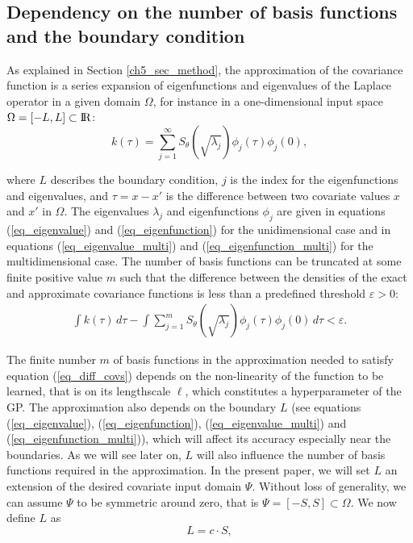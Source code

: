 \documentclass[onecolumn,a4paper,11pt]{article}
\begin{document}
\subsection{Dependency on the number of basis functions and the boundary condition} \label{ch5_subsec_dependency}

As explained in Section \ref{ch5_sec_method}, the approximation of the covariance function is a series expansion of eigenfunctions and eigenvalues of the Laplace operator in a given domain $\Omega$, for instance in a one-dimensional input space $\Omega=[-L,L]\subset {\rm I\!R}$:
%
\begin{equation*}
k(\tau) = \sum_{j=1}^{\infty} S_{\theta} \left(\sqrt{\lambda_j} \right) \phi_j(\tau) \phi_j(0), 
\end{equation*} 

\noindent where $L$ describes the boundary condition, $j$ is the index for the eigenfunctions and eigenvalues, and $\tau=x-x'$ is the difference between two covariate values $x$ and $x'$ in $\Omega$. The eigenvalues $\lambda_j$ and eigenfunctions $\phi_j$ are given in equations (\ref{eq_eigenvalue}) and (\ref{eq_eigenfunction}) for the unidimensional case and in equations (\ref{eq_eigenvalue_multi}) and (\ref{eq_eigenfunction_multi}) for the multidimensional case. The number of basis functions can be truncated at some finite positive value $m$ such that the difference between the densities of the exact and approximate covariance functions is less than a predefined threshold $\varepsilon > 0$:
%
\begin{eqnarray}\label{eq_diff_covs}
\int k(\tau) \, d\tau - 
\int \sum_{j=1}^m S_{\theta}\left(\sqrt{\lambda_j} \right) \phi_j(\tau) \phi_j(0) \, d\tau < \varepsilon.
\end{eqnarray}

The finite number $m$ of basis functions in the approximation needed to satisfy equation (\ref{eq_diff_covs}) depends on the non-linearity of the function to be learned, that is on its lengthscale $\ell$, which constitutes a hyperparameter of the GP. The approximation also depends on the boundary $L$ (see equations (\ref{eq_eigenvalue}), (\ref{eq_eigenfunction}), (\ref{eq_eigenvalue_multi}) and (\ref{eq_eigenfunction_multi})), which will affect its accuracy especially near the boundaries. As we will see later on, $L$ will also influence the number of basis functions required in the approximation. In the present paper, we will set $L$ an extension of the desired covariate input domain $\Psi$. Without loss of generality, we can assume $\Psi$ to be symmetric around zero, that is $\Psi=[-S,S] \subset \Omega$. We now define $L$ as
%
\begin{equation}\label{eq_boundary}
L=c \cdot S,
\end{equation} 
\end{document}
